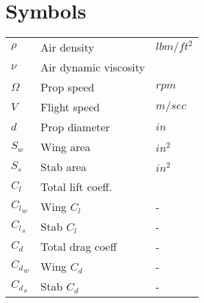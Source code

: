 \section{Symbols}
\begin{tabular}{|l|l|l|}
  \hline
  $\rho$ & Air density & $lbm/ft^2$ \\
  $\nu$ & Air dynamic viscosity & \\
  $\Omega$ & Prop speed & $rpm$ \\
  $V$ & Flight speed & $m/sec$ \\
  $d$ & Prop diameter & $in$ \\
  $S_w$ & Wing area & $in^2$ \\
  $S_s$ & Stab area & $in^2$ \\
  $C_l$ & Total lift coeff. & \\
  ${C_l}_w$ & Wing $C_l$ & - \\
  ${C_l}_s$ & Stab $C_l$ & - \\
  $C_d$ & Total drag coeff  & - \\
  ${C_d}_w$ & Wing $C_d$ & - \\
  ${C_d}_s$ & Stab $C_d$ & - \\
  \hline
\end{tabular}

